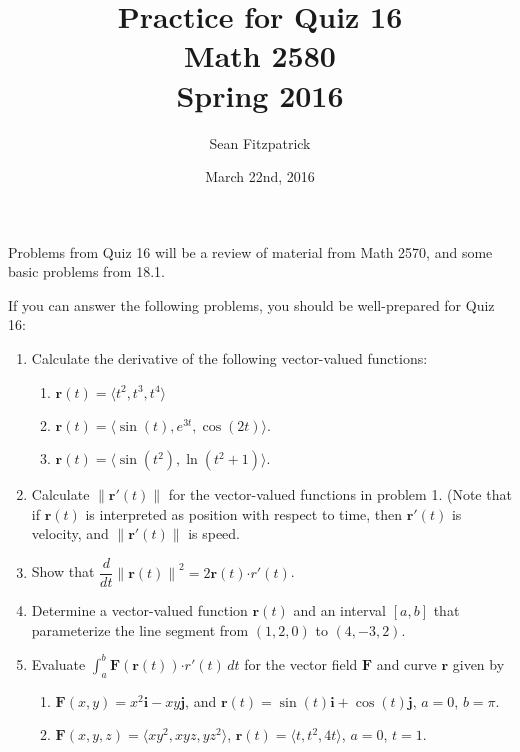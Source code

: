 \documentclass[letterpaper,12pt]{article}
\title{Practice for Quiz 16\\Math 2580\\Spring 2016}
\author{Sean Fitzpatrick}
\date{March 22nd, 2016}
\renewcommand{\i}{\mathbf{i}}
\renewcommand{\j}{\mathbf{j}}
\newcommand{\di}{\displaystyle}
\renewcommand{\r}{\mathbf{r}}
\newcommand{\len}[1]{\left\lVert #1\right\rVert}
\newcommand{\dotp}{\boldsymbol{\cdot}}
\newcommand{\F}{\mathbf{F}}
\begin{document}
 \maketitle

Problems from Quiz 16 will be a review of material from Math 2570, and some basic problems from 18.1.

If you can answer the following problems, you should be well-prepared for Quiz 16:



\begin{enumerate}
 \item Calculate the derivative of the following vector-valued functions:
\begin{enumerate}
 \item $\r(t) = \langle t^2, t^3, t^4\rangle$
 \item $\r(t) = \langle \sin(t), e^{3t}, \cos(2t)\rangle$.
 \item $\r(t) = \langle \sin(t^2), \ln(t^2+1)\rangle$.
\end{enumerate}
 \item Calculate $\len{\r'(t)}$ for the vector-valued functions in problem 1. (Note that if $\r(t)$ is interpreted as position with respect to time, then $\r'(t)$ is velocity, and $\len{\r'(t)}$ is speed.
 \item Show that $\dfrac{d}{dt}\len{\r(t)}^2 = 2\r(t)\dotp r'(t)$. 
 \item Determine a vector-valued function $\r(t)$ and an interval $[a,b]$ that parameterize the line segment from $(1,2,0)$ to $(4,-3,2)$.
 \item Evaluate $\di \int_a^b \F(\r(t))\dotp r'(t)\,dt$ for the vector field $\F$ and curve $\r$ given by
\begin{enumerate}
 \item $\F(x,y) = x^2\i -xy\j$, and $\r(t) = \sin(t)\i+\cos(t)\j$, $a=0$, $b=\pi$.
 \item $\F(x,y,z) = \langle xy^2, xyz, yz^2\rangle$, $\r(t) = \langle t, t^2, 4t\rangle$, $a=0$, $t=1$.
\end{enumerate}


 \end{enumerate}
\end{document}
